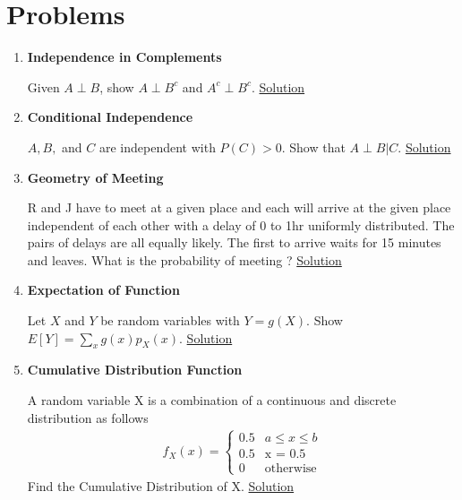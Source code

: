 \documentclass[../probability-notes.tex]{subfiles}
\begin{document}
    \section{Problems}
    \begin{enumerate}
    \item \hypertarget{q_indcomp}{\textbf{Independence in Complements}}\newline
    Given $A \perp B$, show $A \perp B^{c}$ and $A^{c} \perp B^{c}$. \hyperlink{a_indcomp}{Solution}

    \item \hypertarget{q_conind}{\textbf{Conditional Independence}}\newline
    $A,B,$ and $C$ are independent with $P(C) > 0$. Show that $A\perp B |C$. \hyperlink{a_conind}{Solution}

    \item \hypertarget{q_geomeet}{\textbf{Geometry of Meeting}}\newline
    R and J have to meet at a given place and each will arrive at the given place independent of each other with a delay of 0 to 1hr uniformly distributed. The pairs of delays are all equally likely. The first to arrive waits for 15 minutes and leaves. What is the probability of meeting ? \hyperlink{a_geomeet}{Solution}

    \item \hypertarget{q_expfn}{\textbf{Expectation of Function}}\newline
    Let $X$ and $Y$ be random variables with $Y = g(X)$. Show $E[Y] = \sum_{x}g(x)p_{X}(x)$. \hyperlink{a_expfn}{Solution}

    \item \hypertarget{q_cumuldistfn}{\textbf{Cumulative Distribution Function}}\newline
    A random variable X is a combination of a continuous and discrete distribution as follows
    \begin{align*}
        f_{X}(x) = \begin{cases} 0.5 &\mbox{$a \leq x \leq b$}\\
                                 0.5 &\mbox{x = 0.5}\\
                                 0 &\mbox{otherwise} \end{cases}
    \end{align*}
    Find the Cumulative Distribution of X. \hyperlink{a_cumuldistfn}{Solution}


\end{enumerate}
\end{document}
